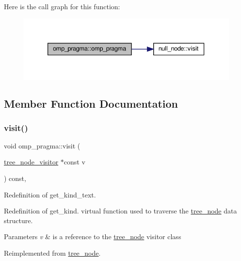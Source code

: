 Here is the call graph for this function\+:
\nopagebreak
\begin{figure}[H]
\begin{center}
\leavevmode
\includegraphics[width=333pt]{dd/dcc/structomp__pragma_a43c08202d68336c34f270657d5ee0207_cgraph}
\end{center}
\end{figure}


\subsection{Member Function Documentation}
\mbox{\label{structomp__pragma_a2e2c445528b7e097ae76fa618a9970b5}} 
\subsubsection{\texorpdfstring{visit()}{visit()}}
{\footnotesize\ttfamily void omp\+\_\+pragma\+::visit (\begin{DoxyParamCaption}\item[{\hyperlink{classtree__node__visitor}{tree\+\_\+node\+\_\+visitor} $\ast$const}]{v }\end{DoxyParamCaption}) const\hspace{0.3cm}{\ttfamily [override]}, {\ttfamily [virtual]}}



Redefinition of get\+\_\+kind\+\_\+text. 

Redefinition of get\+\_\+kind. virtual function used to traverse the \hyperlink{classtree__node}{tree\+\_\+node} data structure. 
\begin{DoxyParams}{Parameters}
{\em v} & is a reference to the \hyperlink{classtree__node}{tree\+\_\+node} visitor class \\
\hline
\end{DoxyParams}


Reimplemented from \hyperlink{classtree__node_aa9abba3f1b30e0be80b4a56b188c6ecc}{tree\+\_\+node}.




